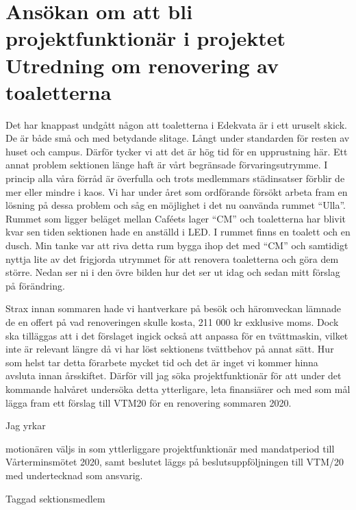 \documentclass[10pt]{article}
\def\doctype{Handlingar} %
\def\mname{Styrelsemöte} %
\def\mnum{S28/19} %
\begin{document}
    
    \heading{{\doctype} till {\mname} {\mnum}}
    


    \section*{Ansökan om att bli projektfunktionär i projektet Utredning om renovering av toaletterna}
    
 	Det har knappast undgått någon att toaletterna i Edekvata är i ett uruselt skick. De är både små och med betydande slitage. Långt under standarden för resten av huset och campus. Därför tycker vi att det är hög tid för en upprustning här. Ett annat problem sektionen länge haft är vårt begränsade förvaringsutrymme. I princip alla våra förråd är överfulla och trots medlemmars städinsatser förblir de mer eller mindre i kaos. Vi har under året som ordförande försökt arbeta fram en lösning på dessa problem och såg en möjlighet i det nu oanvända rummet “Ulla”. Rummet som ligger beläget mellan Caféets lager “CM” och toaletterna har blivit kvar sen tiden sektionen hade en anställd i LED. I rummet finns en toalett och en dusch. Min tanke var att riva detta rum bygga ihop det med “CM” och samtidigt nyttja lite av det frigjorda utrymmet för att renovera toaletterna och göra dem större. Nedan ser ni i den övre bilden hur det ser ut idag och sedan mitt förslag på förändring.

    Strax innan sommaren hade vi hantverkare på besök och häromveckan lämnade de en offert på vad renoveringen skulle kosta, 211 000 kr exklusive moms. Dock ska tilläggas att i det förslaget ingick också att anpassa för en tvättmaskin, vilket inte är relevant längre då vi har löst sektionens tvättbehov på annat sätt. Hur som helst tar detta förarbete mycket tid och det är inget vi kommer hinna avsluta innan årsskiftet. Därför vill jag söka projektfunktionär för att under det kommande halvåret undersöka detta ytterligare, leta finansiärer och med som mål lägga fram ett förslag till VTM20 för en renovering sommaren 2020.  
    
    Jag yrkar 

    \begin{attsatser}
        \att motionären väljs in som yttlerliggare projektfunktionär med mandatperiod till Vårterminsmötet 2020, samt
        \att beslutet läggs på beslutsuppföljningen till VTM/20 med undertecknad som ansvarig. 
    \end{attsatser}

    \begin{signatures}{1}
    \textit{\isekt}
    \signature{Henrik Ramström}{Taggad sektionsmedlem}
    \end{signatures}



   
    
\end{document}
